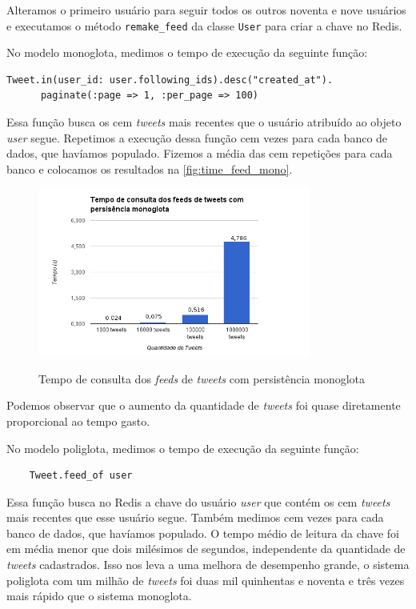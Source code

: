 Alteramos o primeiro usuário para seguir todos os outros noventa e nove usuários e executamos o método \verb|remake_feed| da classe \verb|User| para criar a chave no \ac{Redis}.

No modelo monoglota, medimos o tempo de execução da seguinte função:
\begin{lstlisting}
Tweet.in(user_id: user.following_ids).desc("created_at").
      paginate(:page => 1, :per_page => 100)
\end{lstlisting}

Essa função busca os cem \textit{tweets} mais recentes que o usuário atribuído ao objeto \textit{user} segue. Repetimos a execução dessa função cem vezes para cada banco de dados, que havíamos populado. Fizemos a média das cem repetições para cada banco e colocamos os resultados na \autoref{fig:time_feed_mono}.

\begin{figure}[H]
    \centering
    \caption{Tempo de consulta dos \textit{feeds} de \textit{tweets} com persistência monoglota}
    \includegraphics[width=0.8\textwidth]{./04-figuras/time_feed_mono.png}
    \label{fig:time_feed_mono}
\end{figure}


Podemos observar que o aumento da quantidade de \textit{tweets} foi quase diretamente proporcional ao tempo gasto.


No modelo poliglota, medimos o tempo de execução da seguinte função:
\begin{lstlisting}
	Tweet.feed_of user
\end{lstlisting}

Essa função busca no \ac{Redis} a chave do usuário \textit{user} que contém os cem \textit{tweets} mais recentes que esse usuário segue. Também medimos cem vezes para cada banco de dados, que havíamos populado. O tempo médio de leitura da chave foi em média menor que dois milésimos de segundos, independente da quantidade de \textit{tweets} cadastrados. Isso nos leva a uma melhora de desempenho grande, o sistema poliglota com um milhão de \textit{tweets} foi duas mil quinhentas e noventa e três vezes mais rápido que o sistema monoglota.

